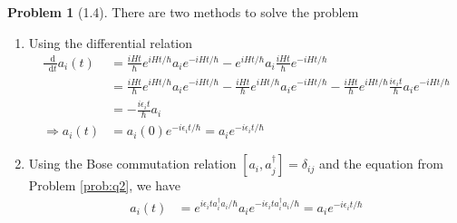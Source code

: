 \documentclass[twoside,11pt]{article}
\renewcommand*\d{\mathop{}\!\mathrm{d}}
\theoremstyle{definition}
\newtheorem{problem}{Problem}
\theoremstyle{remark}
\begin{document}
\begin{problem}[1.4]
There are two methods to solve the problem
\begin{enumerate}[label=(\roman*)]
\item Using the differential relation
\begin{align*}
    \frac{\d}{\d t} a_i(t) &= 
    \frac{iHt}{\hbar}e^{iHt/\hbar}a_ie^{-iHt/\hbar}
    - e^{iHt/\hbar}a_i \frac{iHt}{\hbar}e^{-iHt/\hbar}\\
    &= 
    \frac{iHt}{\hbar}e^{iHt/\hbar}a_ie^{-iHt/\hbar}
    -\frac{iHt}{\hbar}e^{iHt/\hbar}a_ie^{-iHt/\hbar}
    - \frac{iHt}{\hbar}e^{iHt/\hbar}\frac{i\epsilon_i t}{\hbar}a_ie^{-iHt/\hbar}\\
    &= -\frac{i\epsilon_i t}{\hbar}a_i\\
    \Rightarrow
    a_i(t) &= a_i(0) e^{-i\epsilon_it/\hbar} = a_i e^{-i\epsilon_it/\hbar}
\end{align*}

\item Using the Bose commutation relation $[a_i, a_j^\dagger] = \delta_{ij}$ and the equation
from Problem \ref{prob:q2},
we have
\begin{align*}
    a_i(t) &= e^{i\epsilon_it a_i^\dagger a_i/\hbar} 
    a_i e^{-i\epsilon_it a_i^\dagger a_i/\hbar}
    = a_i e^{-i\epsilon_it/\hbar}
\end{align*}

\end{enumerate}

\end{problem}




\end{document}
